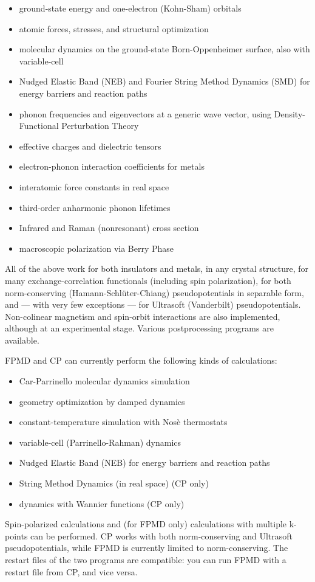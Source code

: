 \documentclass[12pt,a4paper]{article}
\begin{document}
\begin{itemize}
  \item ground-state energy and one-electron (Kohn-Sham) orbitals
  \item atomic forces, stresses, and structural optimization
  \item molecular dynamics on the ground-state Born-Oppenheimer
        surface, also with variable-cell
  \item Nudged Elastic Band (NEB) and Fourier String Method Dynamics (SMD)
        for energy barriers and reaction paths
  \item phonon frequencies and eigenvectors at a generic wave vector,
        using Density-Functional Perturbation Theory
  \item effective charges and dielectric tensors
  \item electron-phonon interaction coefficients for metals
  \item interatomic force constants in real space
  \item third-order anharmonic phonon lifetimes
  \item Infrared and Raman (nonresonant) cross section
  \item macroscopic polarization via Berry Phase
\end{itemize}
All of the above work for both insulators and metals, in any crystal
structure, for many exchange-correlation functionals (including spin
polarization), for both norm-conserving (Hamann-Schl\"uter-Chiang)
pseudopotentials in separable form, and --- with very few exceptions
--- for Ultrasoft (Vanderbilt) pseudopotentials.  Non-colinear
magnetism and spin-orbit interactions are also implemented, although
at an experimental stage.  Various postprocessing programs are
available.

FPMD and CP can currently perform the following kinds of calculations:

\begin{itemize}
  \item Car-Parrinello molecular dynamics simulation
  \item geometry optimization by damped dynamics
  \item constant-temperature simulation with Nos\`e thermostats
  \item variable-cell (Parrinello-Rahman) dynamics
  \item Nudged Elastic Band (NEB) for energy barriers and reaction
        paths
  \item String Method Dynamics (in real space) (CP only)
  \item dynamics with Wannier functions (CP only)
\end{itemize}
Spin-polarized calculations and (for FPMD only) calculations with
multiple k-points can be performed.
CP works with both norm-conserving and Ultrasoft pseudopotentials,
while FPMD is currently limited to norm-conserving.
The restart files of the two programs are compatible: you can run FPMD
with a restart file from CP, and vice versa. 
\end{document}

